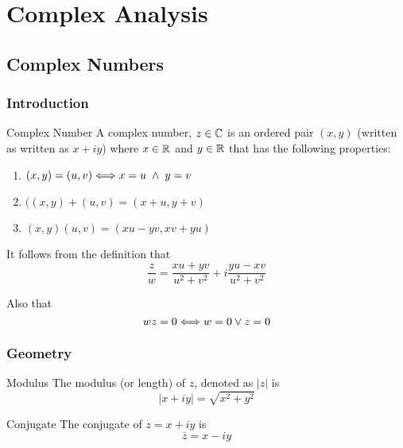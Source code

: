 \documentclass{amsbook}
\begin{document}
\part{Complex Analysis}
\chapter{Complex Numbers}
\section{Introduction}
\newcommand{\complex}[2]{#1 + i#2}
\begin{mydef} {Complex Number}
A complex number, $z \in {\mathbb C}$ is an ordered pair $(x,y)$ (written as written as $\complex x y$) where $x \in {\mathbb R}$ and $y \in {\mathbb R}$ that has the following properties:
\begin{enumerate}
\item $(x,y) = (u,v) \Longleftrightarrow x = u \;\wedge\; y=v$
\item $((x,y) + (u,v) = (x+u,y+v)$
\item $(x,y)(u,v) = (xu - yv, xv + yu)$

\end{enumerate}

\end{mydef}

It follows from the definition that
\begin{equation}
\frac{z}{w} = \frac{xu + yv}{u^2 + v^2} + i \frac{yu-xv}{u^2 + v^2}
\label{eq:complex_div}
\end{equation}

Also that
\begin{equation}
wz = 0 \Longleftrightarrow w = 0 \vee z = 0 
\label{eq:}
\end{equation}
\section{Geometry}
\newcommand{\modulus}[1]{\left| #1 \right|}
\begin{mydef}{Modulus}
The modulus (or length) of $z$, denoted as $\modulus{z}$ is
\begin{equation}
\modulus{\complex x y} = \sqrt{x^2 + y^2}
\label{eq:modulus}
\end{equation}
\end{mydef}

\newcommand{\conjugate}{\overline}

\begin{mydef}{Conjugate}
The conjugate of $z = \complex x y$ is
\begin{equation}
\conjugate z = x - iy
\label{eq:conjugate}
\end{equation}
\end{mydef}
\end{document}
